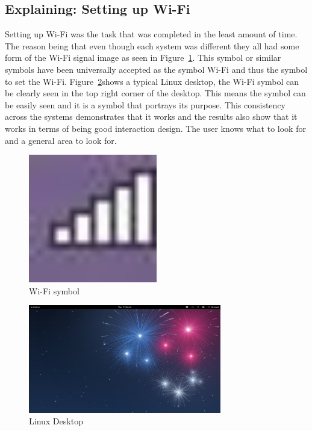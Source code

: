 \documentclass[11pt]{article}
\begin{document}
\subsection{Explaining: Setting up Wi-Fi}
Setting up Wi-Fi was the task that was completed in the least amount of time. The reason being that even though each system was different they all had some form of the Wi-Fi signal image as seen in Figure~\ref{WF}. This symbol or similar symbols have been universally accepted as the symbol Wi-Fi and thus the symbol to set the Wi-Fi. Figure~\ref{LinDesktop}shows a typical Linux desktop, the Wi-Fi symbol can be clearly seen in the top right corner of the desktop. This means the symbol can be easily seen and it is a symbol that portrays its purpose. This consistency across the systems demonstrates that it works and the results also show that it works in terms of being good interaction design. The user knows what to look for and a general area to look for.

\begin{figure}[h!]
  \centering
    \includegraphics[width=0.5\textwidth]{./Images/Symbol_Wi-Fi}
  \caption{Wi-Fi symbol}
 \label{WF}
\end{figure}

\begin{figure}[h!]
  \centering
    \includegraphics[width=0.75\textwidth]{./Images/Linux_Main}
  \caption{Linux Desktop}
 \label{LinDesktop}
\end{figure}
\end{document}
